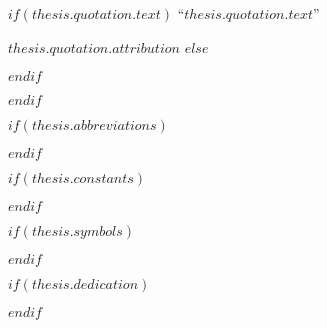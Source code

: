 $if(thesis.quotation.text)$
\noindent``{\itshape $thesis.quotation.text$}''\bigbreak

\hfill $thesis.quotation.attribution$
$else$

$endif$

$endif$



\begingroup
\hypersetup{linkcolor=$if(toclinkcolor)$$toclinkcolor$$else$black$endif$}

\tableofcontents %

\listoffigures %

\listoftables %

\endgroup


$if(thesis.abbreviations)$



$endif$

$if(thesis.constants)$



$endif$

$if(thesis.symbols)$



$endif$

$if(thesis.dedication)$

\dedicatory{} 

$endif$


\mainmatter %

\pagestyle{thesis} %
